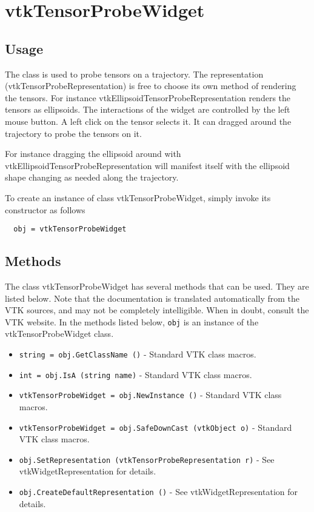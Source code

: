 \section{vtkTensorProbeWidget}

\subsection{Usage}

 The class is used to probe tensors on a trajectory. The representation
 (vtkTensorProbeRepresentation) is free to choose its own method of 
 rendering the tensors. For instance vtkEllipsoidTensorProbeRepresentation
 renders the tensors as ellipsoids. The interactions of the widget are 
 controlled by the left mouse button. A left click on the tensor selects
 it. It can dragged around the trajectory to probe the tensors on it.
 
 For instance dragging the ellipsoid around with 
 vtkEllipsoidTensorProbeRepresentation will manifest itself with the 
 ellipsoid shape changing as needed along the trajectory.

To create an instance of class vtkTensorProbeWidget, simply
invoke its constructor as follows
\begin{verbatim}
  obj = vtkTensorProbeWidget
\end{verbatim}
\subsection{Methods}

The class vtkTensorProbeWidget has several methods that can be used.
  They are listed below.
Note that the documentation is translated automatically from the VTK sources,
and may not be completely intelligible.  When in doubt, consult the VTK website.
In the methods listed below, \verb|obj| is an instance of the vtkTensorProbeWidget class.
\begin{itemize}
\item  \verb|string = obj.GetClassName ()| -  Standard VTK class macros.

\item  \verb|int = obj.IsA (string name)| -  Standard VTK class macros.

\item  \verb|vtkTensorProbeWidget = obj.NewInstance ()| -  Standard VTK class macros.

\item  \verb|vtkTensorProbeWidget = obj.SafeDownCast (vtkObject o)| -  Standard VTK class macros.

\item  \verb|obj.SetRepresentation (vtkTensorProbeRepresentation r)| -  See vtkWidgetRepresentation for details.

\item  \verb|obj.CreateDefaultRepresentation ()| -  See vtkWidgetRepresentation for details.

\end{itemize}
